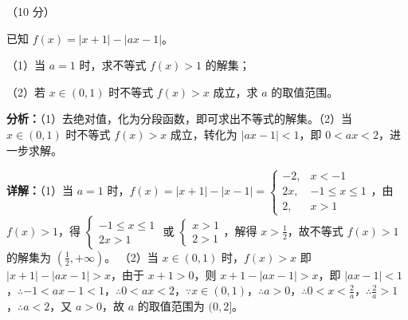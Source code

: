\begin{question}[points=10]
[选修 4-5：不等式选讲]（10 分）

已知 $f(x)=|x+1|-|ax-1|$。

（1）当 $a=1$ 时，求不等式 $f(x)>1$ 的解集；

（2）若 $x\in(0,1)$ 时不等式 $f(x)>x$ 成立，求 $a$ 的取值范围。
\begin{solution}

\textbf{分析：}（1）去绝对值，化为分段函数，即可求出不等式的解集。（2）当 $x\in(0,1)$ 时不等式 $f(x)>x$ 成立，转化为 $|ax-1|<1$，即 $0<ax<2$，进一步求解。

\textbf{详解：}（1）当 $a=1$ 时，$f(x)=|x+1|-|x-1|=\begin{cases} -2, & x<-1 \\ 2x, & -1\le x\le 1 \\ 2, & x>1 \end{cases}$，由 $f(x)>1$，得 $\begin{cases} -1\le x\le 1 \\ 2x>1 \end{cases}$ 或 $\begin{cases} x>1 \\ 2>1 \end{cases}$，解得 $x>\frac{1}{2}$，故不等式 $f(x)>1$ 的解集为 $(\frac{1}{2},+\infty)$。
（2）当 $x\in(0,1)$ 时，$f(x)>x$ 即 $|x+1|-|ax-1|>x$，由于 $x+1>0$，则 $x+1-|ax-1|>x$，即 $|ax-1|<1$，$\therefore -1<ax-1<1$，$\therefore 0<ax<2$，$\because x\in(0,1)$，$\therefore a>0$，$\therefore 0<x<\frac{2}{a}$，$\therefore \frac{2}{a}>1$，$\therefore a<2$，又 $a>0$，故 $a$ 的取值范围为 $(0,2]$。
\end{solution}
\end{question}

